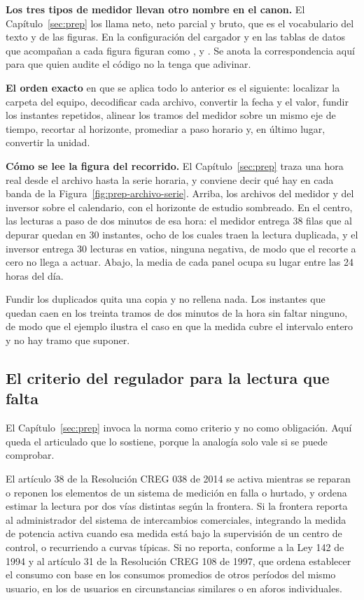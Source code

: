 \textbf{Los tres tipos de medidor llevan otro nombre en el canon.} El
Capítulo~\ref{sec:prep} los llama neto, neto parcial y bruto, que es el
vocabulario del texto y de las figuras. En la configuración del cargador y
en las tablas de datos que acompañan a cada figura figuran como
,  y . Se anota la
correspondencia aquí para que quien audite el código no la tenga que
adivinar.

\textbf{El orden exacto} en que se aplica todo lo anterior es el siguiente:
localizar la carpeta del equipo, decodificar cada archivo, convertir la
fecha y el valor, fundir los instantes repetidos, alinear los tramos del
medidor sobre un mismo eje de tiempo, recortar al horizonte, promediar a
paso horario y, en último lugar, convertir la unidad.

\textbf{Cómo se lee la figura del recorrido.} El
Capítulo~\ref{sec:prep} traza una hora real desde el archivo hasta la serie
horaria, y conviene decir qué hay en cada banda de la
Figura~\ref{fig:prep-archivo-serie}. Arriba, los archivos del medidor y del
inversor sobre el calendario, con el horizonte de estudio sombreado. En el
centro, las lecturas a paso de dos minutos de esa hora: el medidor entrega
38 filas que al depurar quedan en 30 instantes, ocho de los cuales traen la
lectura duplicada, y el inversor entrega 30 lecturas en vatios, ninguna
negativa, de modo que el recorte a cero no llega a actuar. Abajo, la media
de cada panel ocupa su lugar entre las 24 horas del día.

Fundir los duplicados quita una copia y no rellena nada. Los instantes que
quedan caen en los treinta tramos de dos minutos de la hora sin faltar
ninguno, de modo que el ejemplo ilustra el caso en que la medida cubre el
intervalo entero y no hay tramo que suponer.

\subsection{El criterio del regulador para la lectura que falta}
\label{sub:repro-norma}

El Capítulo~\ref{sec:prep} invoca la norma como criterio y no como
obligación. Aquí queda el articulado que lo sostiene, porque la analogía
solo vale si se puede comprobar.

El artículo 38 de la Resolución CREG 038 de 2014 se activa mientras se
reparan o reponen los elementos de un sistema de medición en falla o
hurtado, y ordena estimar la lectura por dos vías distintas según la
frontera. Si la frontera reporta al administrador del sistema de
intercambios comerciales, integrando la medida de potencia activa cuando
esa medida está bajo la supervisión de un centro de control, o recurriendo
a curvas típicas. Si no reporta, conforme a la Ley 142 de 1994 y al
artículo 31 de la Resolución CREG 108 de 1997, que ordena establecer el
consumo con base en los consumos promedios de otros períodos del mismo
usuario, en los de usuarios en circunstancias similares o en aforos
individuales.

